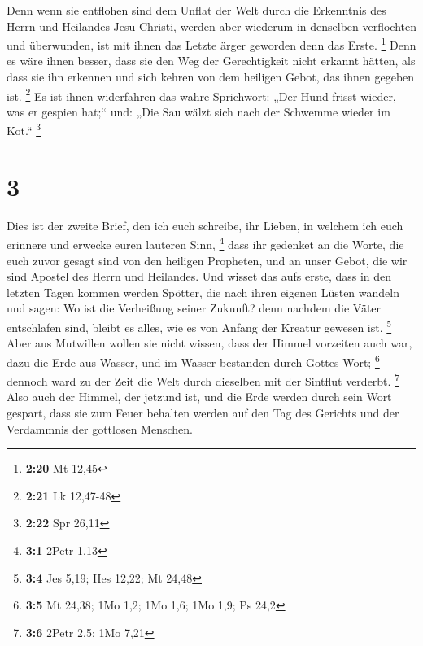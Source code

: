  Denn wenn sie entflohen sind dem Unflat der Welt durch
die Erkenntnis des Herrn und Heilandes Jesu Christi, werden aber
wiederum in denselben verflochten und überwunden, ist mit ihnen das
Letzte ärger geworden denn das Erste. \footnote{\textbf{2:20} Mt 12,45}
 Denn es wäre ihnen besser, dass sie den Weg der
Gerechtigkeit nicht erkannt hätten, als dass sie ihn erkennen und sich
kehren von dem heiligen Gebot, das ihnen gegeben ist. \footnote{\textbf{2:21}
  Lk 12,47-48}  Es ist ihnen widerfahren das wahre
Sprichwort: „Der Hund frisst wieder, was er gespien hat;`` und: „Die Sau
wälzt sich nach der Schwemme wieder im Kot.`` \footnote{\textbf{2:22}
  Spr 26,11}

\hypertarget{section-1}{%
\section{3}\label{section-1}}

 Dies ist der zweite Brief, den ich euch schreibe, ihr
Lieben, in welchem ich euch erinnere und erwecke euren lauteren Sinn,
\footnote{\textbf{3:1} 2Petr 1,13}  dass ihr gedenket an
die Worte, die euch zuvor gesagt sind von den heiligen Propheten, und an
unser Gebot, die wir sind Apostel des Herrn und Heilandes.
 Und wisset das aufs erste, dass in den letzten Tagen
kommen werden Spötter, die nach ihren eigenen Lüsten wandeln
 und sagen: Wo ist die Verheißung seiner Zukunft? denn
nachdem die Väter entschlafen sind, bleibt es alles, wie es von Anfang
der Kreatur gewesen ist. \footnote{\textbf{3:4} Jes 5,19; Hes 12,22; Mt
  24,48}  Aber aus Mutwillen wollen sie nicht wissen, dass
der Himmel vorzeiten auch war, dazu die Erde aus Wasser, und im Wasser
bestanden durch Gottes Wort; \footnote{\textbf{3:5} Mt 24,38; 1Mo 1,2;
  1Mo 1,6; 1Mo 1,9; Ps 24,2}  dennoch ward zu der Zeit die
Welt durch dieselben mit der Sintflut verderbt. \footnote{\textbf{3:6}
  2Petr 2,5; 1Mo 7,21}  Also auch der Himmel, der jetzund
ist, und die Erde werden durch sein Wort gespart, dass sie zum Feuer
behalten werden auf den Tag des Gerichts und der Verdammnis der
gottlosen Menschen.

